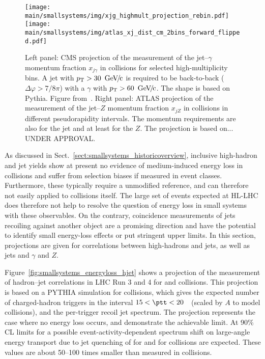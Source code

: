 \documentclass[../report.tex]{subfiles}
\providecommand{\main}{..}
\begin{document}
\begin{figure}[t]
\centering
\texttt{[image: \\main/smallsystems/img/xjg\_highmult\_projection\_rebin.pdf]}
\hfill
\texttt{[image: \\main/smallsystems/img/atlas\_xj\_dist\_cm\_2bins\_forward\_flipped.pdf]}
\caption{Left panel: CMS projection of the measurement of the jet--$\gamma$ momentum fraction $x_{j\gamma}$ in \pp collisions for selected high-multiplicity bins. A jet with $\pT > \unit[30]{\UGeVc}$ is required to be back-to-back ($\Delta\varphi > 7/8\pi$) with a $\gamma$ with $\pT > \unit[60]{\UGeVc}$. The shape is based on Pythia. Figure from~\cite{CMS-PAS-FTR-18-025}. Right panel: ATLAS projection of the measurement of the jet--$Z$ momentum fraction $x_{jZ}$ in \pPb collisions in different pseudorapidity intervals. The momentum requirements are also \unit[30]{\UGeVc} for the jet and at least \unit[60]{\UGeVc} for the $Z$. The projection is based on... UNDER APPROVAL.}
\label{fig:smallsystems_energyloss_xjg_xjz}
\end{figure}

As discussed in Sect.~\ref{sect:smallsystems_historicoverview}, inclusive high-\pT hadron and jet yields show at present no evidence of medium-induced energy loss in \pPb collisions and suffer from selection biases if measured in event classes. Furthermore, these typically require a unmodified reference, and can therefore not easily applied to \pp collisions itself. The large set of events expected at HL-LHC does therefore not help to resolve the question of energy loss in small systems with these observables. On the contrary, coincidence measurements of jets recoiling against another object are a promising direction and have the potential to identify small energy-loss effects or put stringent upper limits. In this section, projections are given for correlations between high-\pT hadrons and jets, as well as jets and $\gamma$ and $Z$.

Figure~\ref{fig:smallsystems_energyloss_hjet} shows a projection of the measurement of hadron--jet correlations in LHC Run 3 and 4 for \pp and \pPb collisions.
This projection is based on a PYTHIA simulation for \pp collisions, which gives the expected number of charged-hadron triggers in the interval $15<\ptt<20$~\UGeV\ (scaled by $A$ to model \pPb collisions), and the per-trigger recoil jet spectrum.
The projection represents the case where no energy loss occurs, and demonstrate the achievable limit. At 90\% CL limits for a possible event-activity-dependent spectrum shift on large-angle energy transport due to jet quenching of \unit[70]{\UMeVc} for \pPb and \unit[175]{\UMeVc} for \pp collisions are expected. These values are about 50--100 times smaller than measured in \PbPb collisions.
\end{document}
